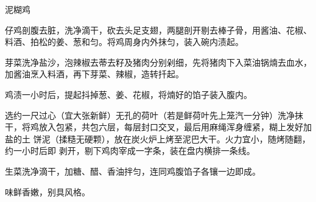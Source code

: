 \begin{recipe}[叫化鸡]{泥糊鸡}

\ingredients


\preparation

\step 仔鸡剖腹去脏，洗净滴干，砍去头足支翅，两腿剖开剔去棒子骨，用酱油、花椒、
料酒、拍松的姜、葱和匀。将鸡周身内外抹匀，装入碗内渍起。

\step 芽菜洗净盐沙，泡辣椒去蒂去籽及猪肉分别剁细，先将猪肉下入菜油锅煵去血水，
加酱油烹入料酒，再下芽菜、辣椒，造转扦起。

\step 鸡渍一小时后，提起抖掉葱、姜、花椒，将煵好的馅子装入腹内。

\step 选约一尺过心（宜大张新鲜）无孔的荷叶（若是鲜荷叶先上笼汽一分钟）洗净抹
干，将鸡放入包紧，共包六层，每层封口交叉，最后用麻绳浑身缠紧，糊上发好加盐的土
饼泥（揉糙无硬颗），放在炭火炉上烤至泥巴大干。火力宜小，随烤随翻，约一小时后即
剥开，剔下鸡肉宰成一字条，装在盘内横排一条线。

\step 生菜洗净滴干，加糖、醋、香油拌匀，连同鸡腹馅子各镶一边即成。

\features

味鲜香嫩，别具风格。

\end{recipe}

